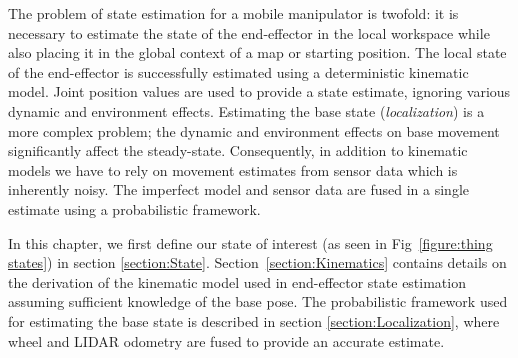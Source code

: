 \documentclass[times, utf8, diplomski, english]{fer}
\begin{document}
The problem of state estimation for a mobile manipulator is twofold: it is necessary to estimate the state of the end-effector in the local workspace while also placing it in the global context of a map or starting position.
The local state of the end-effector is successfully estimated using a deterministic kinematic model.
Joint position values are used to provide a state estimate, ignoring various dynamic and environment effects.
Estimating the base state (\textit{localization}) is a more complex problem; the dynamic and environment effects on base movement significantly affect the steady-state.
Consequently, in addition to kinematic models we have to rely on movement estimates from sensor data which is inherently noisy.
The imperfect model and sensor data are fused in a single estimate using a probabilistic framework.

In this chapter, we first define our state of interest (as seen in Fig~\ref{figure:thing states}) in section \ref{section:State}. 
Section~\ref{section:Kinematics} contains details on the derivation of the kinematic model used in end-effector state estimation assuming sufficient knowledge of the base pose. 
The probabilistic framework used for estimating the base state is described in section \ref{section:Localization}, where wheel and LIDAR odometry are fused to provide an accurate estimate.
\end{document}
